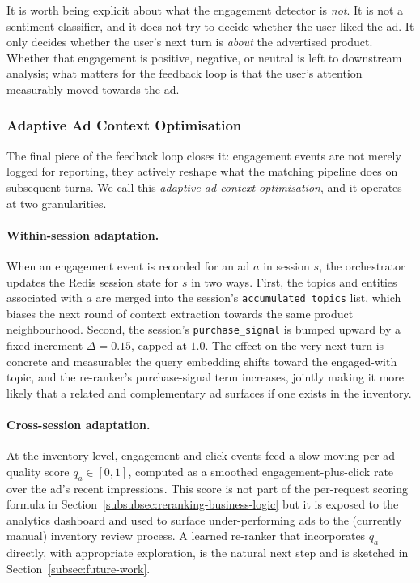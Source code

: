 It is worth being explicit about what the engagement detector is \emph{not}.
It is not a sentiment classifier, and it does not try to decide whether the
user liked the ad. It only decides whether the user's next turn is
\emph{about} the advertised product. Whether that engagement is positive,
negative, or neutral is left to downstream analysis; what matters for the
feedback loop is that the user's attention measurably moved towards the ad.

\subsubsection{Adaptive Ad Context Optimisation}
\label{subsubsec:adaptive-optimisation}

The final piece of the feedback loop closes it: engagement events are not
merely logged for reporting, they actively reshape what the matching
pipeline does on subsequent turns. We call this \emph{adaptive ad context
optimisation}, and it operates at two granularities.

\paragraph{Within-session adaptation.} When an engagement event is recorded
for an ad $a$ in session $s$, the orchestrator updates the Redis session
state for $s$ in two ways. First, the topics and entities associated with
$a$ are merged into the session's \texttt{accumulated\_topics} list, which
biases the next round of context extraction towards the same product
neighbourhood. Second, the session's \texttt{purchase\_signal} is bumped
upward by a fixed increment $\Delta = 0.15$, capped at $1.0$. The effect on
the very next turn is concrete and measurable: the query embedding shifts
toward the engaged-with topic, and the re-ranker's purchase-signal term
increases, jointly making it more likely that a related and complementary
ad surfaces if one exists in the inventory.

\paragraph{Cross-session adaptation.} At the inventory level, engagement and
click events feed a slow-moving per-ad quality score
$q_a \in [0,1]$, computed as a smoothed engagement-plus-click rate over the
ad's recent impressions. This score is not part of the per-request scoring
formula in Section~\ref{subsubsec:reranking-business-logic} but it is exposed to the analytics
dashboard and used to surface under-performing ads to the (currently
manual) inventory review process. A learned re-ranker that incorporates
$q_a$ directly, with appropriate exploration, is the natural next step and
is sketched in Section~\ref{subsec:future-work}.

